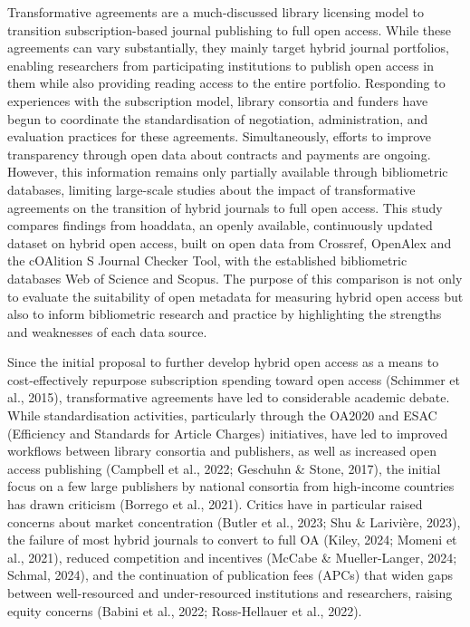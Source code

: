 \documentclass[a4paper,man,floatsintext,longtable,noextraspace,10pt]{apa6}
\begin{document}
Transformative agreements are a much-discussed library licensing model
to transition subscription-based journal publishing to full open access.
While these agreements can vary substantially, they mainly target hybrid
journal portfolios, enabling researchers from participating institutions
to publish open access in them while also providing reading access to
the entire portfolio. Responding to experiences with the subscription
model, library consortia and funders have begun to coordinate the
standardisation of negotiation, administration, and evaluation practices
for these agreements. Simultaneously, efforts to improve transparency
through open data about contracts and payments are ongoing. However,
this information remains only partially available through bibliometric
databases, limiting large-scale studies about the impact of
transformative agreements on the transition of hybrid journals to full
open access. This study compares findings from hoaddata, an openly
available, continuously updated dataset on hybrid open access, built on
open data from Crossref, OpenAlex and the cOAlition S Journal Checker
Tool, with the established bibliometric databases Web of Science and
Scopus. The purpose of this comparison is not only to evaluate the
suitability of open metadata for measuring hybrid open access but also
to inform bibliometric research and practice by highlighting the
strengths and weaknesses of each data source.

Since the initial proposal to further develop hybrid open access as a
means to cost-effectively repurpose subscription spending toward open
access (Schimmer et al., 2015), transformative agreements have led to
considerable academic debate. While standardisation activities,
particularly through the OA2020 and ESAC (Efficiency and Standards for
Article Charges) initiatives, have led to improved workflows between
library consortia and publishers, as well as increased open access
publishing (Campbell et al., 2022; Geschuhn \& Stone, 2017), the initial
focus on a few large publishers by national consortia from high-income
countries has drawn criticism (Borrego et al., 2021). Critics have in
particular raised concerns about market concentration (Butler et al.,
2023; Shu \& Larivière, 2023), the failure of most hybrid journals to
convert to full OA (Kiley, 2024; Momeni et al., 2021), reduced
competition and incentives (McCabe \& Mueller-Langer, 2024; Schmal,
2024), and the continuation of publication fees (APCs) that widen gaps
between well-resourced and under-resourced institutions and researchers,
raising equity concerns (Babini et al., 2022; Ross-Hellauer et al.,
2022).
\end{document}
